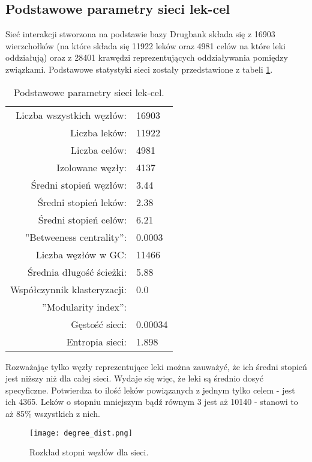 \documentclass[11pt]{article}
\begin{document}
\subsection{Podstawowe parametry sieci lek-cel}

Sieć interakcji stworzona na podstawie bazy Drugbank składa się z 16903 wierzchołków (na które składa się 11922 leków oraz 4981 celów na które leki oddziałują) oraz z 28401 krawędzi reprezentujących oddziaływania pomiędzy związkami. Podstawowe statystyki sieci zostały przedstawione z tabeli \ref{t:stats}.

\begin{table}[h!]
\begin{center}
\caption{Podstawowe parametry sieci lek-cel.}
\label{t:stats}
\begin{tabular}{rl}

	Liczba wszystkich węzłów: & 16903\\
	Liczba leków: & 11922\\
	Liczba celów: & 4981\\
	Izolowane węzły: & 4137\\
	Średni stopień węzłów: & 3.44\\
	Średni stopień leków: & 2.38\\
	Średni stopień celów: & 6.21\\
	''Betweeness centrality'': & 0.0003\\
	Liczba węzłów w GC: & 11466\\
	Średnia długość ścieżki: & 5.88\\
	Współczynnik klasteryzacji: & 0.0\\
	''Modularity index'': & \\
	Gęstość sieci: & 0.00034\\
	Entropia sieci: & 1.898\\

\end{tabular}
\end{center}
\end{table}

Rozważając tylko węzły reprezentujące leki można zauważyć, że ich średni stopień jest niższy niż dla całej sieci. Wydaje się więc, że leki są średnio dosyć specyficzne. Potwierdza to ilość leków powiązanych z jednym tylko celem - jest ich 4365. Leków o stopniu mniejszym bądź równym 3 jest aż 10140 - stanowi to aż 85\% wszystkich z nich.

\begin{figure}[h!]
\begin{center}
\texttt{[image: degree\_dist.png]}
\caption{Rozkład stopni węzłów dla sieci.}
\label{fig:degree_dist}
\end{center}
\end{figure}
\end{document}
